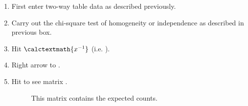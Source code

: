 \begin{termBox}{
\begin{enumerate}
\setlength{\itemsep}{0mm}
\item First enter two-way table data as described previously.
\item Carry out the chi-square test of homogeneity or independence as described in previous box.
\item Hit  $\calctextmath{x^{-1}}$ (i.e. ).
\item Right arrow to .
\item Hit  to see matrix .
\begin{description}
\item[] This matrix contains the expected counts.
\end{description}
\end{enumerate}
}
\end{termBox}

